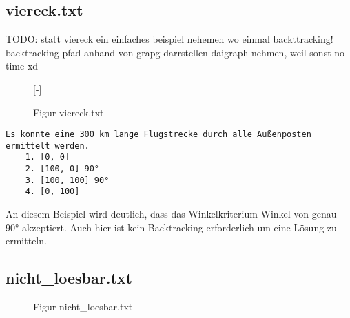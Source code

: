 \documentclass[a4paper,10pt,ngerman]{scrartcl}
\begin{document}
    \subsection{viereck.txt}\label{subsec:viereck.txt}

    TODO: statt viereck ein einfaches beispiel nehemen wo einmal backttracking!
    backtracking pfad anhand von grapg darrstellen
    daigraph nehmen, weil sonst no time xd

    \begin{figure}[H]
        [-]
        \FigurFuenf{}
        \caption{Figur viereck.txt}
        \label{fig:Figure3}
    \end{figure}

    \begin{lstlisting}[frame=single, title=Programmausgabe viereck.txt, breaklines=true,label={lst:lstlisting3}]
    Es konnte eine 300 km lange Flugstrecke durch alle Außenposten ermittelt werden.
    1. [0, 0]
    2. [100, 0] 90°
    3. [100, 100] 90°
    4. [0, 100]
    \end{lstlisting}

    An diesem Beispiel wird deutlich, dass das Winkelkriterium Winkel von genau 90° akzeptiert.
    Auch hier ist kein Backtracking erforderlich um eine Lösung zu ermitteln.

    \subsection{nicht\_loesbar.txt}\label{subsec:nichtloesbar.txt}


    \begin{figure}[H]
        \centering
        \caption{Figur nicht\_loesbar.txt}
        \label{fig:Figure4}
    \end{figure}
\end{document}
